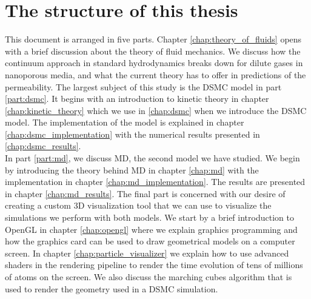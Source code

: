 \section{The structure of this thesis}
This document is arranged in five parts. Chapter \ref{chap:theory_of_fluids} opens with a brief discussion about the theory of fluid mechanics. We discuss how the continuum approach in standard hydrodynamics breaks down for dilute gases in nanoporous media, and what the current theory has to offer in predictions of the permeability. The largest subject of this study is the DSMC model in part \ref{part:dsmc}. It begins with an introduction to kinetic theory in chapter \ref{chap:kinetic_theory} which we use in \ref{chap:dsmc} when we introduce the DSMC model. The implementation of the model is explained in chapter \ref{chap:dsmc_implementation} with the numerical results presented in \ref{chap:dsmc_results}.\\
In part \ref{part:md}, we discuss MD, the second model we have studied. We begin by introducing the theory behind MD in chapter \ref{chap:md} with the implementation in chapter \ref{chap:md_implementation}. The results are presented in chapter \ref{chap:md_results}. The final part is concerned with our desire of creating a custom 3D visualization tool that we can use to visualize the simulations we perform with both models. We start by a brief introduction to OpenGL in chapter \ref{chap:opengl} where we explain graphics programming and how the graphics card can be used to draw geometrical models on a computer screen. In chapter \ref{chap:particle_visualizer} we explain how to use advanced shaders in the rendering pipeline to render the time evolution of tens of millions of atoms on the screen. We also discuss the marching cubes algorithm that is used to render the geometry used in a DSMC simulation.

